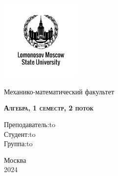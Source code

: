 \documentclass[a4paper, 12pt]{article}
\theoremstyle{definition}
\begin{document}
  \begin{titlepage}
    \newpage
    
    \begin{center}
    \includegraphics[width=4cm]{images.png}
    \end{center}
    
    \vspace{4em}
    
    \begin{center}
    \Large Механико-математический факультет  
    \end{center}
    
    \vspace{2em}
    
    \begin{center}
    \large{\textsc{\textbf{Алгебра, 1 семестр, 2 поток}}}
    \end{center}
    
    \vspace{6em}
    

    
    \newbox{\lbox}
    \newlength{\maxl}
    \setlength{\maxl}{\wd\lbox}
    \hfill\parbox{11cm}
    {
    \hspace*{5cm}\hspace*{-5cm}Преподаватель:\hfill\hbox to \\

    \hspace*{5cm}\hspace*{-5cm}Студент:\hfill\hbox to\\

    \hspace*{5cm}\hspace*{-5cm}Группа:\hfill\hbox to
    }
    
    \vspace{\fill}
    
    \begin{center}
    Москва \\2024 
    \end{center}
  \end{titlepage}
  \tableofcontents
  \fontsize{14pt}{20pt}\selectfont
  \newpage
  \fontsize{14pt}{20pt}\selectfont
\end{document}
